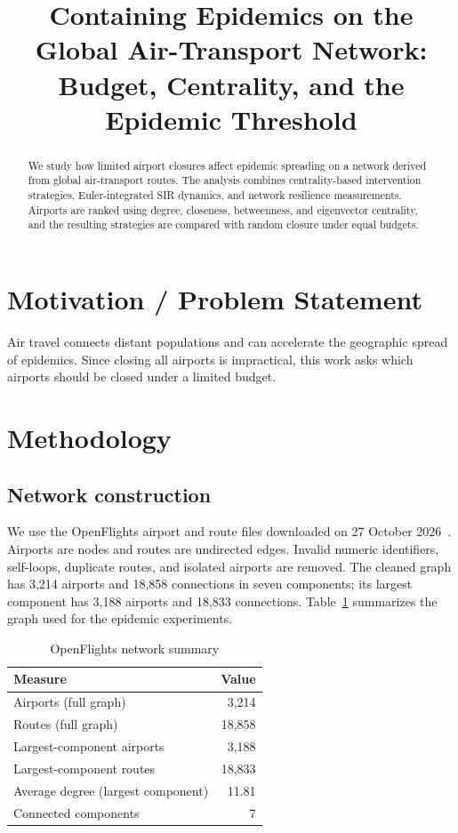 \documentclass[conference]{IEEEtran}
\title{Containing Epidemics on the Global Air-Transport Network:\\
Budget, Centrality, and the Epidemic Threshold}
\author{
\IEEEauthorblockN{Krish Dhola (202301189), Prince Sojitra (202301126), Jenish Vasani (202301057)}
\IEEEauthorblockA{Group 22}
}
\begin{document}
\maketitle

\begin{abstract}
We study how limited airport closures affect epidemic spreading on a network derived from global air-transport routes. The analysis combines centrality-based intervention strategies, Euler-integrated SIR dynamics, and network resilience measurements. Airports are ranked using degree, closeness, betweenness, and eigenvector centrality, and the resulting strategies are compared with random closure under equal budgets.
\end{abstract}

\section{Motivation / Problem Statement}
Air travel connects distant populations and can accelerate the geographic spread of epidemics. Since closing all airports is impractical, this work asks which airports should be closed under a limited budget.~\cite{keeling2005,pastorsatorras2015}

\section{Methodology}
\subsection{Network construction}
We use the OpenFlights airport and route files downloaded on 27 October 2026~\cite{openflights}. Airports are nodes and routes are undirected edges. Invalid numeric identifiers, self-loops, duplicate routes, and isolated airports are removed. The cleaned graph has 3,214 airports and 18,858 connections in seven components; its largest component has 3,188 airports and 18,833 connections. Table~\ref{tab:network} summarizes the graph used for the epidemic experiments.

\begin{table}[t]
\caption{OpenFlights network summary}
\label{tab:network}
\centering
\begin{tabular}{lr}
\toprule
Measure & Value\\
\midrule
Airports (full graph) & 3,214\\
Routes (full graph) & 18,858\\
Largest-component airports & 3,188\\
Largest-component routes & 18,833\\
Average degree (largest component) & 11.81\\
Connected components & 7\\
\bottomrule
\end{tabular}
\end{table}
\end{document}
